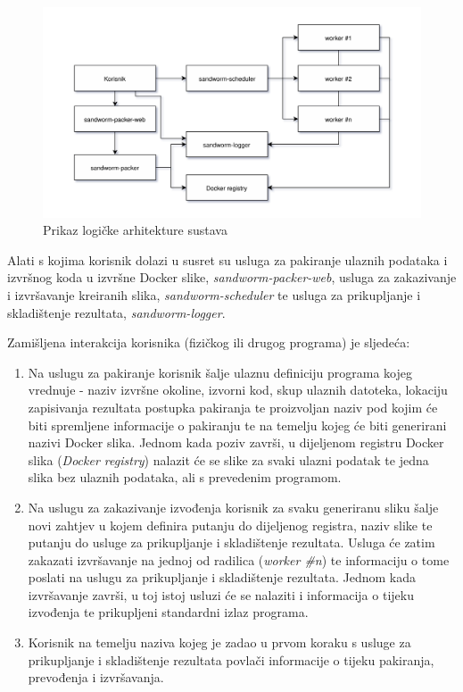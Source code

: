 \documentclass[times, utf8, zavrsni]{fer}
\begin{document}
\begin{figure}[H]
	\centering
	\includegraphics[width=\textwidth]{sandworm-schema.png}
	\caption{Prikaz logičke arhitekture sustava}
\end{figure}

Alati s kojima korisnik dolazi u susret su usluga za pakiranje ulaznih podataka i izvršnog koda u izvršne Docker slike, {\textit{sandworm-packer-web}}, usluga za zakazivanje i izvršavanje kreiranih slika, {\textit{sandworm-scheduler}} te usluga za prikupljanje i skladištenje rezultata, {\textit{sandworm-logger}}.

\hfill
\break

Zamišljena interakcija korisnika (fizičkog ili drugog programa) je sljedeća:

\begin{enumerate}
\item Na uslugu za pakiranje korisnik šalje ulaznu definiciju programa kojeg vrednuje - naziv izvršne okoline, izvorni kod, skup ulaznih datoteka, lokaciju zapisivanja rezultata postupka pakiranja te proizvoljan naziv pod kojim će biti spremljene informacije o pakiranju te na temelju kojeg će biti generirani nazivi Docker slika. Jednom kada poziv završi, u dijeljenom registru Docker slika ({\textit{Docker registry}}) nalazit će se slike za svaki ulazni podatak te jedna slika bez ulaznih podataka, ali s prevedenim programom.
\item Na uslugu za zakazivanje izvođenja korisnik za svaku generiranu sliku šalje novi zahtjev u kojem definira putanju do dijeljenog registra, naziv slike te putanju do usluge za prikupljanje i skladištenje rezultata. Usluga će zatim zakazati izvršavanje na jednoj od radilica ({\textit{worker \#n}}) te informaciju o tome poslati na uslugu za prikupljanje i skladištenje rezultata. Jednom kada izvršavanje završi, u toj istoj usluzi će se nalaziti i informacija o tijeku izvođenja te prikupljeni standardni izlaz programa.
\item Korisnik na temelju naziva kojeg je zadao u prvom koraku s usluge za prikupljanje i skladištenje rezultata povlači informacije o tijeku pakiranja, prevođenja i izvršavanja.
\end{enumerate}
\end{document}
